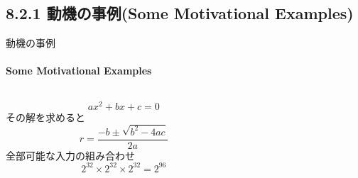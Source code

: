 \subsection{8.2.1 動機の事例(Some Motivational Examples)}
\begin{frame}{動機の事例}
\framesubtitle{Some Motivational Examples}
\begin{columns}
\begin{column}{0.5\textwidth}
\[ ax^2+bx+c = 0 \]
\pause
その解を求めると
\[ r=\frac{-b \pm \sqrt{b^2-4ac}}{2a} \]
\pause
全部可能な入力の組み合わせ
\[ 2^{32} \times 2^{32} \times 2^{32} = 2^{96}\]
\end{column}
\begin{column}{0.5\textwidth}
\end{column}
\end{columns}
\end{frame}
